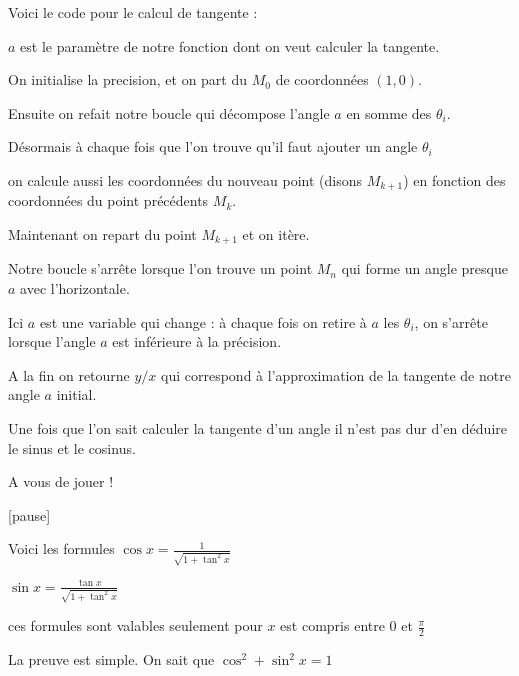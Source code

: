 \diapo

Voici le code pour le calcul de tangente :

$a$ est le paramètre de notre fonction dont on veut calculer la tangente.

On initialise la precision,
et on part du $M_0$ de coordonnées $(1,0)$.

\change

Ensuite on refait notre boucle qui décompose l'angle $a$
en somme des $\theta_i$.

\change

Désormais à chaque fois que l'on trouve qu'il faut ajouter un angle $\theta_i$ 

on calcule aussi les coordonnées du nouveau point (disons $M_{k+1}$) en fonction
des coordonnées du point précédents $M_k$.

\change

Maintenant on repart du point $M_{k+1}$ et on itère.

Notre boucle s'arrête lorsque l'on trouve un point $M_n$ 
qui forme un angle presque $a$ avec l'horizontale.

Ici $a$ est une variable qui change : à chaque fois on retire à $a$ les $\theta_i$, 
on s'arrête lorsque l'angle $a$ est inférieure à la précision.

\change

A la fin on retourne $y/x$ qui correspond à l'approximation de la tangente 
de notre angle $a$ initial.


\diapo


Une fois que l'on sait calculer la tangente d'un angle il n'est pas dur d'en déduire
le sinus et le cosinus.

A vous de jouer !

[pause]


\change

Voici les formules $\cos x = \frac{1}{\sqrt{1+\tan^2 x}}$

\change

$\sin x = \frac{\tan x}{\sqrt{1+\tan^2 x}}$

\change 

ces formules sont valables seulement pour $x$ est compris entre $0$ et $\frac \pi2$

\change


La preuve est simple. On sait que $\cos^2+\sin^2 x = 1$

\change

